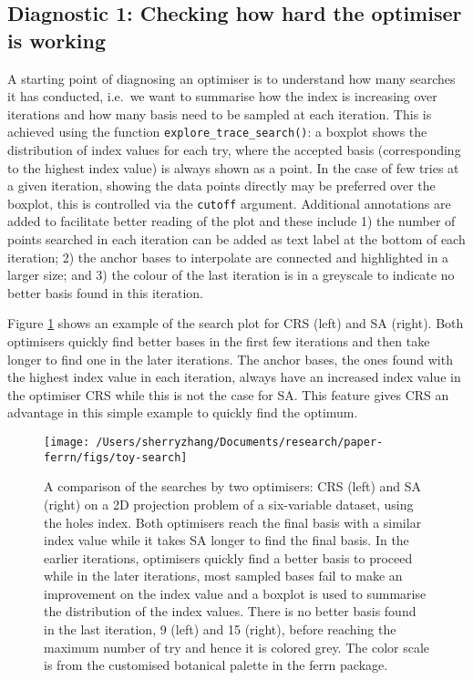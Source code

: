 \hypertarget{diagnostic-1-checking-how-hard-the-optimiser-is-working}{%
\subsection{Diagnostic 1: Checking how hard the optimiser is
working}\label{diagnostic-1-checking-how-hard-the-optimiser-is-working}}

A starting point of diagnosing an optimiser is to understand how many
searches it has conducted, i.e.~we want to summarise how the index is
increasing over iterations and how many basis need to be sampled at each
iteration. This is achieved using the function
\texttt{explore\_trace\_search()}: a boxplot shows the distribution of
index values for each try, where the accepted basis (corresponding to
the highest index value) is always shown as a point. In the case of few
tries at a given iteration, showing the data points directly may be
preferred over the boxplot, this is controlled via the \texttt{cutoff}
argument. Additional annotations are added to facilitate better reading
of the plot and these include 1) the number of points searched in each
iteration can be added as text label at the bottom of each iteration; 2)
the anchor bases to interpolate are connected and highlighted in a
larger size; and 3) the colour of the last iteration is in a greyscale
to indicate no better basis found in this iteration.

Figure \ref{fig:toy-search} shows an example of the search plot for CRS
(left) and SA (right). Both optimisers quickly find better bases in the
first few iterations and then take longer to find one in the later
iterations. The anchor bases, the ones found with the highest index
value in each iteration, always have an increased index value in the
optimiser CRS while this is not the case for SA. This feature gives CRS
an advantage in this simple example to quickly find the optimum.

\begin{Schunk}
\begin{figure}

{\centering \texttt{[image: /Users/sherryzhang/Documents/research/paper-ferrn/figs/toy-search]} 

}

\caption[A comparison of the searches by two optimisers]{A comparison of the searches by two optimisers: CRS (left) and SA (right) on a 2D projection problem of a six-variable dataset,  using the holes index. Both optimisers reach the final basis with a similar index value while it takes SA longer to find the final basis. In the earlier iterations, optimisers quickly find a better basis to proceed while in the later iterations, most sampled bases fail to make an improvement on the index value and a boxplot is used to summarise the distribution of the index values. There is no better basis found in the last iteration, 9 (left) and 15 (right), before reaching the maximum number of try and hence it is colored grey. The color scale is from the customised botanical palette in the ferrn package.}\label{fig:toy-search}
\end{figure}
\end{Schunk}

